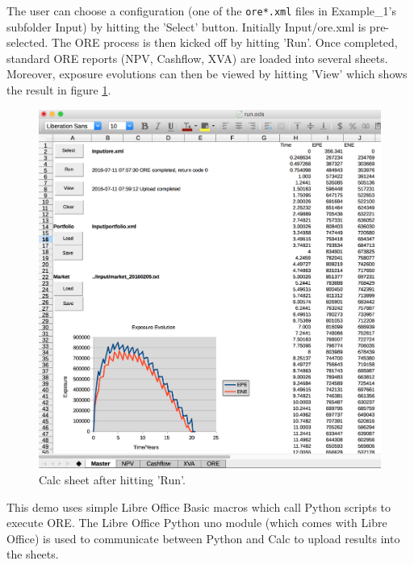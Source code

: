 \documentclass[12pt, a4paper]{article}
\begin{document}
The user can choose a configuration (one of the {\tt ore*.xml} files in Example\_1's subfolder Input) by hitting the
'Select' button. Initially Input/ore.xml is pre-selected. The ORE process is then kicked off by hitting 'Run'. Once
completed, standard ORE reports (NPV, Cashflow, XVA) are loaded into several sheets. Moreover, exposure evolutions can
then be viewed by hitting 'View' which shows the result in figure \ref{fig_16}.  \\
\begin{figure}[h]
\begin{center}
\includegraphics[scale=0.4]{demo_calc_2}
\end{center}
\caption{Calc sheet after hitting 'Run'.}
\label{fig_16}
\end{figure}

This demo uses simple Libre Office Basic macros which call Python scripts to execute ORE. The Libre Office Python uno
module (which comes with Libre Office) is used to communicate between Python and Calc to upload results into the sheets.
\end{document}

